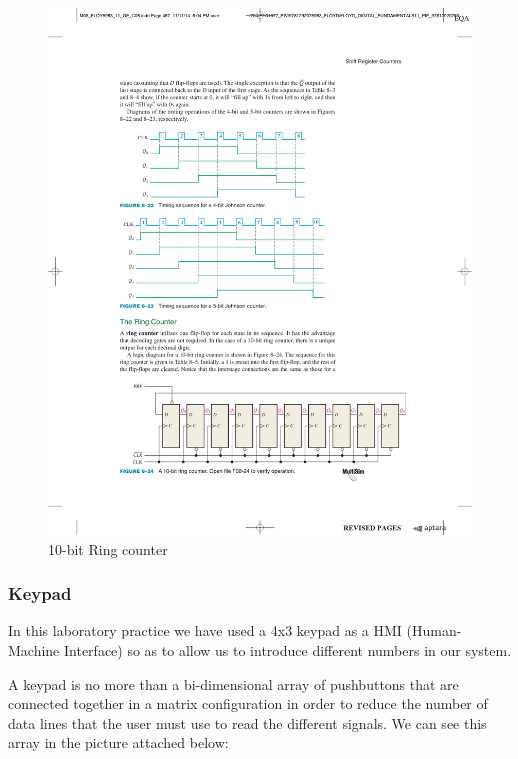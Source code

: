 \begin{figure}[H]
    \centering
    \includegraphics[scale = 0.8]{Graphics/VHDL/Practice 5/COUNTERS/RING_COUNTER.pdf}
    \caption{10-bit Ring counter ~\autocite{FLOYD}}
    \label{fig:RING_10bit}
\end{figure}

\clearpage

\subsubsection{Keypad}
\label{sec:KEYPAD}

In this laboratory practice we have used a 4x3 keypad as a HMI (Human-Machine Interface) so as to allow us to introduce different numbers in our system.\medskip

A keypad is no more than a bi-dimensional array of pushbuttons that are connected together in a matrix configuration in order to reduce the number of data lines that the user must use to read the different signals. We can see this array in the picture attached below:


